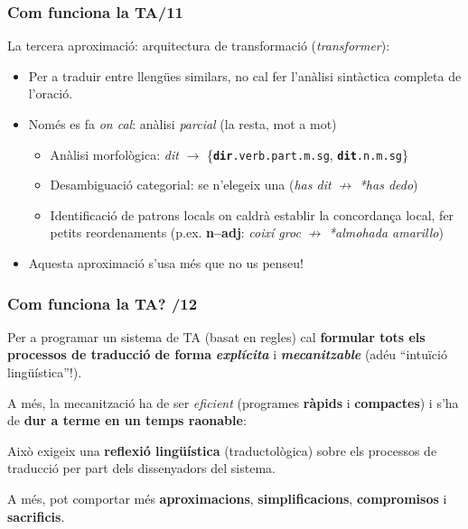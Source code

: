 \documentclass{beamer}
\newcommand{\empha}[1]{\emph{#1}\/}
\begin{document}
\begin{frame}
  \frametitle{Com funciona la TA/11}

  La tercera aproximació: arquitectura de transformació
  (\empha{transformer}):

  \begin{itemize}
  \item Per a traduir entre llengües similars, no cal fer l'anàlisi sintàctica completa de l'oració.
  \item Només es fa \empha{on cal}: anàlisi \empha{parcial} (la resta, mot a mot)
    \begin{itemize}
    \item Anàlisi morfològica: \empha{dit} \(\to\) \{\texttt{\textbf{dir}.verb.part.m.sg}, \texttt{\textbf{dit}.n.m.sg}\}
    \item Desambiguació categorial: se n'elegeix una (\empha{has dit} \(\not\to\) \empha{*has dedo})
    \item Identificació de patrons locals on caldrà establir la
      concordança local, fer petits reordenaments (p.ex. \textbf{n--adj}: \empha{coixí groc} \(\not\to\) \empha{*almohada amarillo})
    \end{itemize}
  \item Aquesta aproximació s'usa més que no us penseu!
  \end{itemize}

\end{frame}

\begin{frame}
\frametitle{ Com funciona la TA? /12}
{
  
  { Per a programar un sistema de TA (basat en regles) cal \textbf{formular
      tots els processos de traducció de forma} \empha{\textbf{explícita}} i
    \empha{\textbf{mecanitzable}}} {(adéu ``intuïció
    lingüística''!).}
  
  {A més, la mecanització ha de ser \empha{eficient} (programes
    \textbf{ràpids} i \textbf{compactes}) i s'ha de
    \textbf{dur a terme en un temps raonable}:}
\begin{itemize}\setlength{\itemsep}{0pt}
{\item Això exigeix una \textbf{reflexió lingüística}
  (traductològica) sobre els processos de traducció per part dels
  dissenyadors del sistema.}
{\item A més, pot comportar més \textbf{aproximacions},
  \textbf{simplificacions}, \textbf{compromisos} i
  \textbf{sacrificis}.}
\end{itemize}
}
\end{frame}
\end{document}
